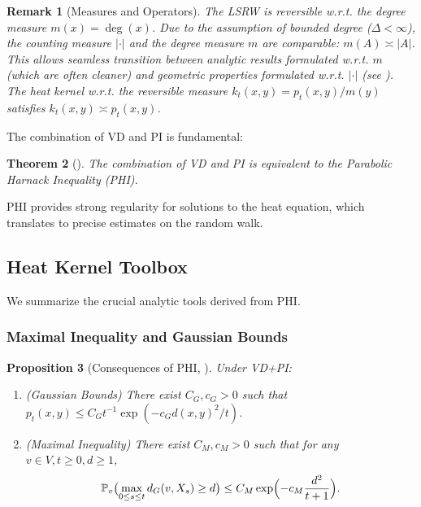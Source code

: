\documentclass[11pt]{article}
\numberwithin{equation}{section}
\newtheorem{theorem}{Theorem}[section]
\newtheorem{proposition}[theorem]{Proposition}
\newtheorem{remark}[theorem]{Remark}
\newcommand{\Prob}{\mathbb{P}}
\begin{document}
\begin{remark}[Measures and Operators]\label{rem:measures_operators}
The LSRW is reversible w.r.t. the degree measure $m(x)=\deg(x)$. Due to the assumption of bounded degree ($\Delta < \infty$), the counting measure $|\cdot|$ and the degree measure $m$ are comparable: $m(A) \asymp |A|$. This allows seamless transition between analytic results formulated w.r.t. $m$ (which are often cleaner) and geometric properties formulated w.r.t. $|\cdot|$ (see \cite{Coulhon03}). The heat kernel w.r.t. the reversible measure $k_t(x,y) = p_t(x,y)/m(y)$ satisfies $k_t(x,y) \asymp p_t(x,y)$.
\end{remark}

The combination of VD and PI is fundamental:

\begin{theorem}[\cite{Delmotte99}]\label{thm:Delmotte}
The combination of VD and PI is equivalent to the Parabolic Harnack Inequality (PHI).
\end{theorem}

PHI provides strong regularity for solutions to the heat equation, which translates to precise estimates on the random walk.

\subsection{Heat Kernel Toolbox}
We summarize the crucial analytic tools derived from PHI.

\subsubsection{Maximal Inequality and Gaussian Bounds}

\begin{proposition}[Consequences of PHI, \cite{Delmotte99}]\label{prop:maximal}
Under VD+PI:
\begin{enumerate}
    \item (Gaussian Bounds) There exist $C_G, c_G > 0$ such that $p_t(x,y) \leq C_G t^{-1} \exp(-c_G d(x,y)^2/t)$.
    \item (Maximal Inequality) There exist $C_M,c_M > 0$ such that for any $v \in V, t \geq 0, d \geq 1$,
\[
\Prob_v\bigl( \max_{0 \leq s \leq t} d_G(v,X_s) \geq d \bigr) \leq C_M \exp\Bigl(-c_M \frac{d^2}{t+1}\Bigr).
\]
\end{enumerate}
\end{proposition}
\end{document}
